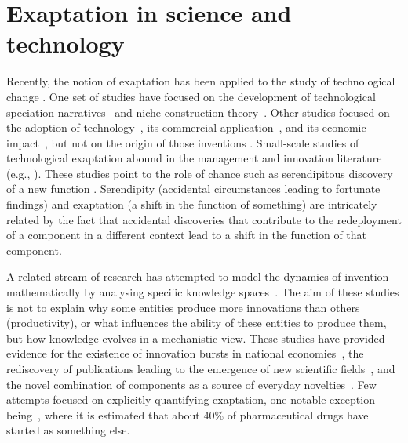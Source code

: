 \documentclass[draft,final]{vutinfth} %
\begin{document}
\section{Exaptation in science and technology}
Recently, the notion of exaptation has been applied to the study of technological change \cite{bonifati2010more,dew2004economic}. One set of studies have focused on the development of technological speciation narratives~\cite{dew2004economic,levinthal1998slow,andriani2013exaptation} and niche construction theory~\cite{dew2016exaptation}. Other studies focused on the adoption of technology~\cite{rogers2010diffusion}, its commercial application~\cite{schumpeter1939business}, and its economic impact~\cite{dew2016exaptation}, but not on the origin of those inventions \cite{fleming2004science}. Small-scale studies of technological exaptation abound in the management and innovation literature (e.g., \cite{tan2015alexander, dew2016exaptation, cattani2005preadaptation,rosenman1988serendipity}). These studies point to the role of chance such as serendipitous discovery of a new function \cite{andriani2013exaptation}. Serendipity (accidental circumstances leading to fortunate findings)  and exaptation (a shift in the function of something) are intricately related by the fact that accidental discoveries that contribute to the redeployment of a component in a different context lead to a shift in the function of that component.

A related stream of research has attempted to model the dynamics of invention mathematically by analysing specific knowledge spaces~\cite{tria2014dynamics,loreto2016dynamics,thurner2010schumpeterian,klimek2010evolutionary,klimek2012empirical,hidalgo2009building,tacchella2012new,servedio2018new,kauffman1993origins, gabora2013quantum}. The aim of these studies is not to explain why some entities produce more innovations than others (productivity), or what influences the ability of these entities to produce them, but how knowledge evolves in a mechanistic view. 
These studies have provided evidence for the existence of innovation bursts in national economies~\cite{thurner2010schumpeterian,klimek2012empirical}, the rediscovery of publications leading to the emergence of new scientific fields~\cite{thurner2019role,van2004sleeping}, and the novel combination of components as a source of everyday novelties~\cite{tria2014dynamics}. 
Few attempts focused on explicitly quantifying exaptation, one notable exception being~\cite{andriani2017measuring}, where it is estimated that about 40\% of pharmaceutical drugs have started as something else. 
\end{document}
